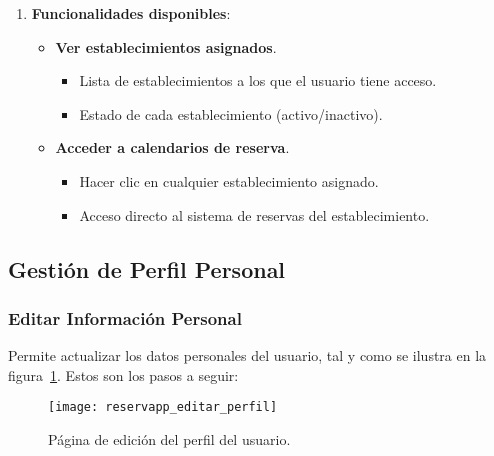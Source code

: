 \begin{enumerate}
   \item \textbf{Funcionalidades disponibles}:
   \begin{itemize}
      \item \textbf{Ver establecimientos asignados}.
      \begin{itemize}
         \item Lista de establecimientos a los que el usuario tiene acceso.
         \item Estado de cada establecimiento (activo/inactivo).
      \end{itemize}

      \item \textbf{Acceder a calendarios de reserva}.
      \begin{itemize}
         \item Hacer clic en cualquier establecimiento asignado.
         \item Acceso directo al sistema de reservas del establecimiento.
      \end{itemize}
   \end{itemize}
\end{enumerate}

\subsection{Gestión de Perfil Personal}

\subsubsection{Editar Información Personal}
Permite actualizar los datos personales del usuario, tal y como se ilustra en la figura~\ref{fig:reservapp_editar_perfil}. Estos son los pasos a seguir:

\begin{figure}[H]
	\centering
		\texttt{[image: reservapp\_editar\_perfil]}
	\caption{Página de edición del perfil del usuario.}
	\label{fig:reservapp_editar_perfil}
\end{figure}

